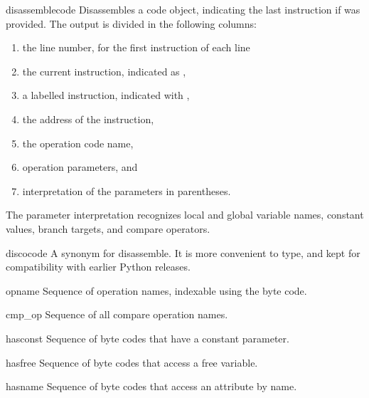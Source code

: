 \begin{funcdesc}{disassemble}{code}
Disassembles a code object, indicating the last instruction if 
was provided.  The output is divided in the following columns:

\begin{enumerate}
\item the line number, for the first instruction of each line
\item the current instruction, indicated as \samp{-->},
\item a labelled instruction, indicated with \samp{>\code{>}},
\item the address of the instruction,
\item the operation code name,
\item operation parameters, and
\item interpretation of the parameters in parentheses.
\end{enumerate}

The parameter interpretation recognizes local and global
variable names, constant values, branch targets, and compare
operators.
\end{funcdesc}

\begin{funcdesc}{disco}{code}
A synonym for disassemble.  It is more convenient to type, and kept
for compatibility with earlier Python releases.
\end{funcdesc}

\begin{datadesc}{opname}
Sequence of operation names, indexable using the byte code.
\end{datadesc}

\begin{datadesc}{cmp_op}
Sequence of all compare operation names.
\end{datadesc}

\begin{datadesc}{hasconst}
Sequence of byte codes that have a constant parameter.
\end{datadesc}

\begin{datadesc}{hasfree}
Sequence of byte codes that access a free variable.
\end{datadesc}

\begin{datadesc}{hasname}
Sequence of byte codes that access an attribute by name.
\end{datadesc}

